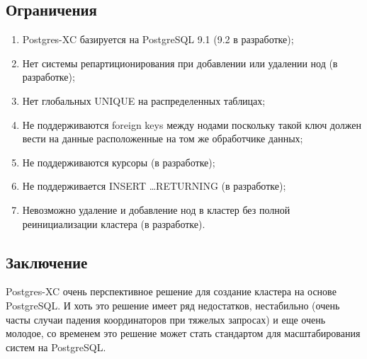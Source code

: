 \subsection{Ограничения}

\begin{enumerate}
  \item Postgres-XC базируется на PostgreSQL 9.1 (9.2 в разработке);
  \item Нет системы репартиционирования при добавлении или удалении нод (в разработке);
  \item Нет глобальных UNIQUE на распределенных таблицах;
  \item Не поддерживаются foreign keys между нодами поскольку такой ключ должен вести на данные расположенные на том же обработчике данных;
  \item Не поддерживаются курсоры (в разработке);
  \item Не поддерживается INSERT \dots RETURNING (в разработке);
  \item Невозможно удаление и добавление нод в кластер без полной реинициализации кластера (в разработке).
\end{enumerate}

\subsection{Заключение}

Postgres-XC очень перспективное решение для создание кластера на основе PostgreSQL. И хоть это решение имеет ряд недостатков, нестабильно (очень часты случаи падения координаторов при тяжелых запросах) и еще очень молодое, со временем это решение может стать стандартом для масштабирования систем на PostgreSQL.